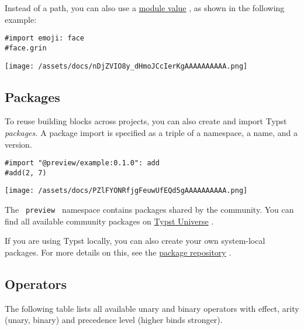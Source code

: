 Instead of a path, you can also use a
\href{/docs/reference/foundations/module/}{module value} , as shown in
the following example:

\begin{verbatim}
#import emoji: face
#face.grin
\end{verbatim}

\texttt{[image: /assets/docs/nDjZVIO8y\_dHmoJCcIerKgAAAAAAAAAA.png]}

\subsection{Packages}\label{packages}

To reuse building blocks across projects, you can also create and import
Typst \emph{packages.} A package import is specified as a triple of a
namespace, a name, and a version.

\begin{verbatim}
#import "@preview/example:0.1.0": add
#add(2, 7)
\end{verbatim}

\texttt{[image: /assets/docs/PZlFYONRfjgFeuwUfEQd5gAAAAAAAAAA.png]}

The \texttt{\ preview\ } namespace contains packages shared by the
community. You can find all available community packages on
\href{https://typst.app/universe/}{Typst Universe} .

If you are using Typst locally, you can also create your own
system-local packages. For more details on this, see the
\href{https://github.com/typst/packages}{package repository} .

\subsection{Operators}\label{operators}

The following table lists all available unary and binary operators with
effect, arity (unary, binary) and precedence level (higher binds
stronger).

